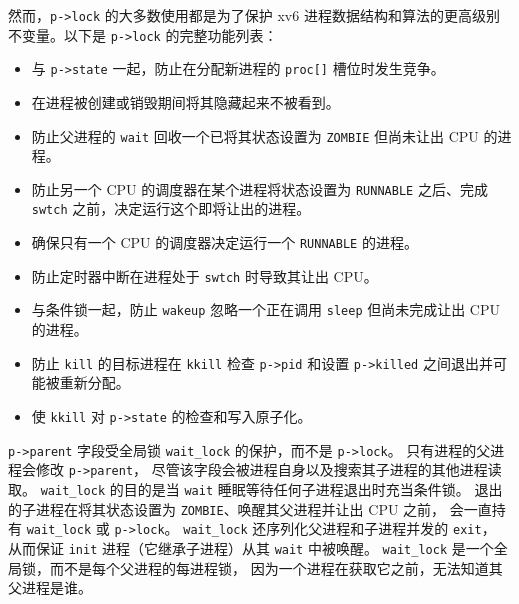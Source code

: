 然而，\lstinline{p->lock} 的大多数使用都是为了保护 xv6 进程数据结构和算法的更高级别不变量。以下是 \lstinline{p->lock} 的完整功能列表：



\begin{itemize}

\item 与 \lstinline{p->state} 一起，防止在分配新进程的 \lstinline{proc[]} 槽位时发生竞争。

\item 在进程被创建或销毁期间将其隐藏起来不被看到。

\item 防止父进程的 \lstinline{wait} 回收一个已将其状态设置为 \lstinline{ZOMBIE} 但尚未让出 CPU 的进程。

\item 防止另一个 CPU 的调度器在某个进程将状态设置为 \lstinline{RUNNABLE} 之后、完成 \lstinline{swtch} 之前，决定运行这个即将让出的进程。

\item 确保只有一个 CPU 的调度器决定运行一个 \lstinline{RUNNABLE} 的进程。

\item 防止定时器中断在进程处于 \lstinline{swtch} 时导致其让出 CPU。

\item 与条件锁一起，防止 \lstinline{wakeup} 忽略一个正在调用 \lstinline{sleep} 但尚未完成让出 CPU 的进程。

\item 防止 \lstinline{kill} 的目标进程在 \lstinline{kkill} 检查 \lstinline{p->pid} 和设置 \lstinline{p->killed} 之间退出并可能被重新分配。

\item 使 \lstinline{kkill} 对 \lstinline{p->state} 的检查和写入原子化。

\end{itemize}

\lstinline{p->parent} 字段受全局锁
\lstinline{wait_lock} 的保护，而不是 \lstinline{p->lock}。
只有进程的父进程会修改 \lstinline{p->parent}，
尽管该字段会被进程自身以及搜索其子进程的其他进程读取。
\lstinline{wait_lock} 的目的是当 \lstinline{wait} 睡眠等待任何子进程退出时充当条件锁。
退出的子进程在将其状态设置为 \lstinline{ZOMBIE}、唤醒其父进程并让出 CPU 之前，
会一直持有 \lstinline{wait_lock} 或 \lstinline{p->lock}。
\lstinline{wait_lock} 还序列化父进程和子进程并发的 \lstinline{exit}，
从而保证 \lstinline{init} 进程（它继承子进程）从其 \lstinline{wait} 中被唤醒。
\lstinline{wait_lock} 是一个全局锁，而不是每个父进程的每进程锁，
因为一个进程在获取它之前，无法知道其父进程是谁。


